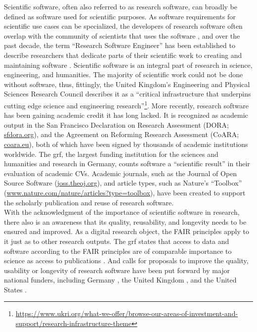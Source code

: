 Scientific software, often also referred to as research software, can broadly be defined as software used for scientific purposes.
As software requirements for scientific use cases can be specialized, the developers of research software often overlap with the community of scientists that uses the software \citep{hannay2009scientists}, and over the past decade, the term ``Research Software Engineer'' has been established to describe researchers that dedicate parts of their scientific work to creating and maintaining software \citep{hettrickRSE}.
Scientific software is an integral part of research in science, engineering, and humanities.
The majority of scientific work could not be done without software, thus, fittingly, the United Kingdom's Engineering and Physical Sciences Research Council describes it as a ``critical infrastructure that underpins cutting edge science and engineering research''\footnote{\url{https://www.ukri.org/what-we-offer/browse-our-areas-of-investment-and-support/research-infrastructure-theme}}.
More recently, research software has been gaining academic credit it has long lacked.
It is recognized as academic output in the San Francisco Declaration on Research Assessment (DORA; \href{https://sfdora.org/}{sfdora.org}), and the Agreement on Reforming Research Assessment (CoARA; \href{https://coara.eu}{coara.eu}), both of which have been signed by thousands of academic institutions worldwide. The \gls{grf}, the largest funding institution for the sciences and humanities and research in Germany, counts software a ``scientific result'' in their evaluation of academic CVs.
Academic journals, such as the Journal of Open Source Software (\href{https://joss.theoj.org/}{joss.theoj.org}), and article types, such as Nature's ``Toolbox'' (\href{https://www.nature.com/nature/articles?type=toolbox}{www.nature.com/nature/articles?type=toolbox}), have been created to support the scholarly publication and reuse of research software.\\
With the acknowledgment of the importance of scientific software in research, there also is an awareness that its quality, reusability, and longevity needs to be ensured and improved.
As a digital research object, the \gls{FAIR} principles apply to it just as to other research outputs.
The \gls{grf} states that access to data and software according to the FAIR principles are of comparable importance to science as access to publications \citep{dfg}.
And calls for proposals to improve the quality, usability or longevity of research software have been put forward by major national funders, including Germany \citep[e.g.,][]{dfgrs}, the United Kingdom \citep[e.g.,][]{ukri}, and the United States \citep[e.g.,][]{nih}.\\
